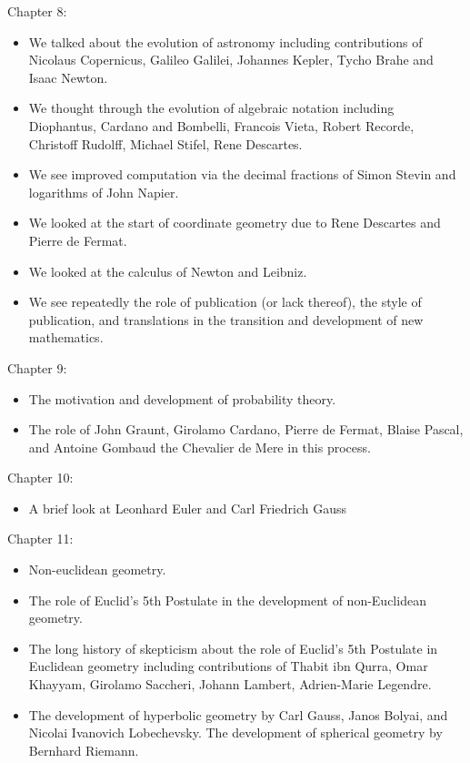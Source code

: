 \documentclass[11pt,fleqn]{article}
\begin{document}
Chapter 8:\\
\begin{itemize}
\item We talked about the evolution of astronomy including contributions of Nicolaus Copernicus, Galileo Galilei, Johannes Kepler, Tycho Brahe and Isaac Newton.
\item We thought through the evolution of algebraic notation including Diophantus, Cardano and Bombelli, Francois Vieta, Robert Recorde, Christoff Rudolff, Michael Stifel, Rene Descartes.
\item We see improved computation via the decimal fractions of Simon Stevin and logarithms of John Napier.
\item We looked at the start of coordinate geometry due to Rene Descartes and Pierre de Fermat.
\item We looked at the calculus of Newton and Leibniz.
\item We see repeatedly the role of publication (or lack thereof), the style of publication, and translations in the transition and development of new mathematics.
\end{itemize}

Chapter 9:\\
\begin{itemize}
\item The motivation and development of probability theory. 
\item The role of John Graunt, Girolamo Cardano, Pierre de Fermat, Blaise Pascal, and Antoine Gombaud the Chevalier de Mere in this process.
\end{itemize}

Chapter 10:\\
\begin{itemize}
\item A brief look at Leonhard Euler and Carl Friedrich Gauss
\end{itemize}

Chapter 11:\\
\begin{itemize}
\item Non-euclidean geometry.
\item The role of Euclid's 5th Postulate in the development of non-Euclidean geometry.
\item The long history of skepticism about the role of Euclid's 5th Postulate in Euclidean geometry including contributions of Thabit ibn Qurra,  Omar Khayyam, Girolamo Saccheri, Johann Lambert, Adrien-Marie Legendre.
\item The development of hyperbolic geometry by Carl Gauss, Janos Bolyai, and Nicolai Ivanovich Lobechevsky. The development of spherical geometry by Bernhard Riemann.
\end{itemize}
\end{document}

